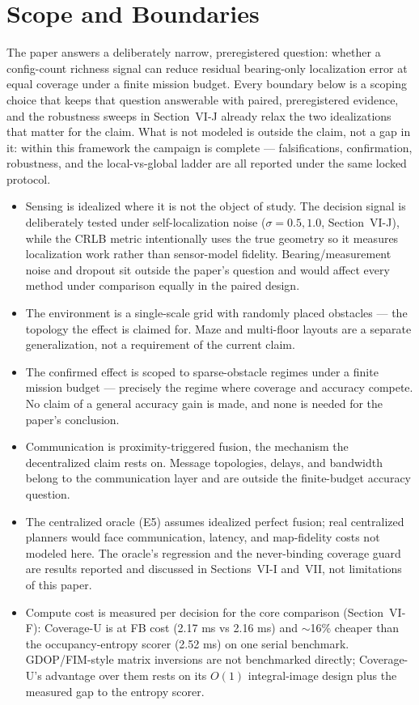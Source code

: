 \documentclass[journal]{IEEEtran}
\newcommand{\CU}{Coverage-U}
\begin{document}
\section{Scope and Boundaries}
The paper answers a deliberately narrow, preregistered question: whether a
config-count richness signal can reduce residual bearing-only localization
error at equal coverage under a finite mission budget. Every boundary below is
a scoping choice that keeps that question answerable with paired,
preregistered evidence, and the robustness sweeps in Section~VI-J already
relax the two idealizations that matter for the claim. What is not modeled is
outside the claim, not a gap in it: within this framework the campaign is
complete --- falsifications, confirmation, robustness, and the local-vs-global
ladder are all reported under the same locked protocol.
\begin{itemize}
\item Sensing is idealized where it is not the object of study. The decision
signal is deliberately tested under self-localization noise ($\sigma = 0.5,
1.0$, Section~VI-J), while the CRLB metric intentionally uses the true geometry
so it measures localization work rather than sensor-model fidelity.
Bearing/measurement noise and dropout sit outside the paper's question and
would affect every method under comparison equally in the paired design.
\item The environment is a single-scale grid with randomly placed obstacles ---
the topology the effect is claimed for. Maze and multi-floor layouts are a
separate generalization, not a requirement of the current claim.
\item The confirmed effect is scoped to sparse-obstacle regimes under a finite
mission budget --- precisely the regime where coverage and accuracy compete. No
claim of a general accuracy gain is made, and none is needed for the paper's
conclusion.
\item Communication is proximity-triggered fusion, the mechanism the
decentralized claim rests on. Message topologies, delays, and bandwidth belong
to the communication layer and are outside the finite-budget accuracy question.
\item The centralized oracle (E5) assumes idealized perfect fusion; real
centralized planners would face communication, latency, and map-fidelity costs
not modeled here. The oracle's regression and the never-binding coverage guard
are results reported and discussed in Sections~VI-I and~VII, not limitations
of this paper.
\item Compute cost is measured per decision for the core comparison
(Section~VI-F): \CU{} is at FB cost (2.17 ms vs 2.16 ms) and $\sim$16\% cheaper
than the occupancy-entropy scorer (2.52 ms) on one serial benchmark.
GDOP/FIM-style matrix inversions are not benchmarked directly; \CU's{}
advantage over them rests on its $O(1)$ integral-image design plus the measured
gap to the entropy scorer.
\end{itemize}
\end{document}

